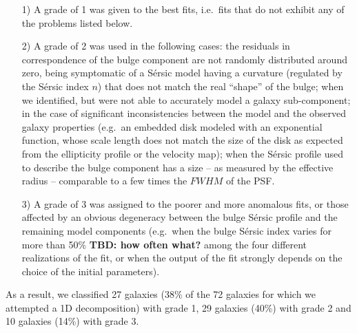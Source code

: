 \documentclass[preprint2]{emulateapj}
\begin{document}
\begin{itemize}
\item [1)] A grade of 1 was given to the best fits, i.e.~fits that do not exhibit any of the problems listed below.
\item [2)] A grade of 2 was used in the following cases: 
the residuals in correspondence of the bulge component are not randomly distributed around zero, 
being symptomatic of a S\'ersic model having a curvature (regulated by the S\'ersic index $n$) 
that does not match the real ``shape'' of the bulge; 
when we identified, but were not able to accurately model a galaxy sub-component;
in the case of significant inconsistencies between the model and the observed galaxy properties 
(e.g.~an embedded disk modeled with an exponential function, 
whose scale length does not match the size of the disk as expected from the ellipticity profile or the velocity map);
when the S\'ersic profile used to describe the bulge component has a size -- as measured by the effective radius -- 
comparable to a few times the $FWHM$ of the PSF.
\item [3)] A grade of 3 was assigned to the poorer and more anomalous fits, 
or those affected by an obvious degeneracy between the bulge S\'ersic profile and the remaining model components 
(e.g.~when the bulge S\'ersic index varies for more than 50\% {\bf TBD: how often what?} among the four different realizations of the fit, 
or when the output of the fit strongly depends on the choice of the initial parameters).
\end{itemize}
As a result, we classified 27 galaxies (38\% of the 72 galaxies for which we attempted a 1D decomposition) with grade 1, 
29 galaxies (40\%) with grade 2 and 10 galaxies (14\%) with grade 3.
\end{document}

